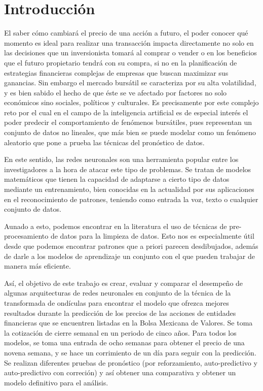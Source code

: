 \chapter{Introducción} %
\label{cap:intro} %



El saber cómo cambiará el precio de una acción a futuro, el poder conocer qué momento es ideal para realizar una transacción impacta directamente no solo en las decisiones que un inversionista tomará al comprar o vender o en los beneficios que el futuro propietario tendrá con su compra, si no en la planificación de estrategias financieras complejas de empresas que buscan maximizar sus ganancias. Sin embargo el mercado bursátil se caracteriza por su alta volatilidad, y es bien sabido el hecho de que éste se ve afectado por factores no solo económicos sino sociales, políticos y culturales. Es precisamente por este complejo reto por el cual en el campo de la inteligencia artificial es de especial interés el poder predecir el comportamiento de fenómenos bursátiles, pues representan un conjunto de datos no lineales, que más bien se puede modelar como un fenómeno aleatorio que pone a prueba las técnicas del pronóstico de datos.

En este sentido, las redes neuronales son una herramienta popular entre los investigadores a la hora de atacar este tipo de problemas. Se tratan de modelos matemáticos que tienen la capacidad de adaptarse a cierto tipo de datos mediante un entrenamiento, bien conocidas en la actualidad por sus aplicaciones en el reconocimiento de patrones, teniendo como entrada la voz, texto o cualquier conjunto de datos.

Aunado a esto, podemos encontrar en la literatura el uso de técnicas de pre-procesamiento de datos para la limpieza de datos. Esto nos es especialmente útil desde que podemos encontrar patrones que a priori parecen desdibujados, además de darle a los modelos de aprendizaje un conjunto con el que pueden trabajar de manera más eficiente.

Así, el objetivo de este trabajo es crear, evaluar y comparar el desempeño de algunas arquitecturas de redes neuronales en conjunto de la técnica de la transformada de ondículas para encontrar el modelo que ofrezca mejores resultados durante la predicción de los precios de las acciones de entidades financieras que se encuentren listadas en la Bolsa Mexicana de Valores. Se toma la cotización de cierre semanal en un periodo de cinco años. Para todos los modelos, se toma una entrada de ocho semanas para obtener el precio de una novena semana, y se hace un corrimiento de un día para seguir con la predicción. Se realizan diferentes pruebas de pronóstico (por reforzamiento, auto-predictivo y auto-predictivo con correción) y así obtener una comparativa y obtener un modelo definitivo para el análisis.
